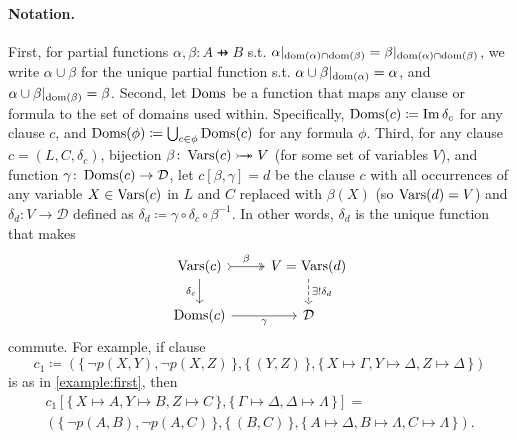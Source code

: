 \paragraph*{Notation.}
First, for partial functions $\alpha, \beta\colon A \pfun B$ s.t.
$\alpha|_{\operatorname{dom}(\alpha) \cap \operatorname{dom}(\beta)} = \beta|_{\operatorname{dom}(\alpha) \cap \operatorname{dom}(\beta)}$,
we write $\alpha \cup \beta$ for the unique partial function s.t.
$\alpha \cup \beta|_{\operatorname{dom}(\alpha)} = \alpha$, and
$\alpha \cup \beta|_{\operatorname{dom}(\beta)} = \beta$. Second, let $\operatorname{Doms}$ be a function
that maps any clause or formula to the set of domains used within. Specifically,
$\operatorname{Doms}(c) \coloneqq \operatorname{Im} \delta_c$ for any clause $c$, and
$\operatorname{Doms}(\phi) \coloneqq \bigcup_{c \in \phi} \operatorname{Doms}(c)$ for any formula $\phi$.
Third, for any clause $c = (L, C, \delta_c)$, bijection
$\beta\colon \operatorname{Vars}(c) \mathrel{\rightarrowtail\kern-1.9ex\twoheadrightarrow} V$ (for some set of variables $V$),
and function $\gamma\colon \operatorname{Doms}(c) \to \mathcal{D}$, let $c[\beta, \gamma] = d$
be the clause $c$ with all occurrences of any variable $X \in \operatorname{Vars}(c)$ in $L$
and $C$ replaced with $\beta(X)$ (so $\operatorname{Vars}(d) = V$) and
$\delta_d\colon V \to \mathcal{D}$ defined as
$\delta_d \coloneqq \gamma \circ \delta_c \circ \beta^{-1}$. In other words,
$\delta_d$ is the unique function that makes
\[
  \begin{tikzcd}
    \Vars(c) \ar[r, tail, two heads, "\beta"] \arrow[d, swap, "\delta_c"] & V = \Vars(d) \ar[d, dashed, "\exists!\delta_d"] \\
    \Doms(c) \ar[r, swap, "\gamma"] & \mathcal{D}
  \end{tikzcd}
\]
commute. For example, if clause
\[
  c_1 \coloneqq (\{\, \neg p(X, Y), \neg p(X, Z) \,\}, \{\, (Y, Z) \,\}, \{\, X \mapsto \Gamma, Y \mapsto \Delta, Z \mapsto \Delta \,\})
\]
is as in \cref{example:first}, then
\begin{multline*}
  c_1[\{\, X \mapsto A, Y \mapsto B, Z \mapsto C \,\}, \{\, \Gamma \mapsto \Delta, \Delta \mapsto \Lambda \,\}] = \\
  (\{\, \neg p(A, B), \neg p(A, C) \,\}, \{\, (B, C) \,\}, \{\, A \mapsto \Delta, B \mapsto \Lambda, C \mapsto \Lambda \,\}).
\end{multline*}


